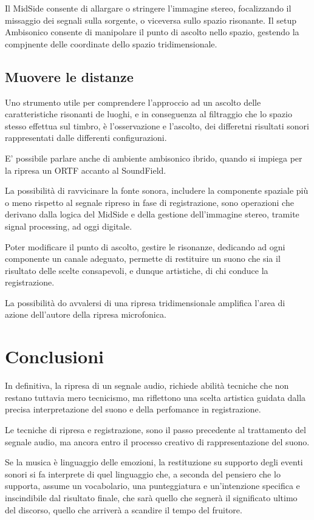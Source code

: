 Il MidSide consente di allargare o stringere l'immagine stereo, focalizzando
il missaggio dei segnali sulla sorgente, o viceversa sullo spazio risonante.
Il setup Ambisonico consente di manipolare il punto di ascolto nello spazio, 
gestendo la compjnente delle coordinate dello spazio tridimensionale.


      
 \subsection*{Muovere le distanze}
 Uno strumento utile per comprendere l'approccio ad un ascolto delle 
 caratteristiche risonanti de luoghi, e in conseguenza al filtraggio che 
 lo spazio stesso effettua sul timbro, è l'osservazione e l'ascolto,
 dei differetni risultati sonori rappresentati dalle differenti configurazioni.
 
 E' possibile parlare anche di ambiente ambisonico ibrido, quando si impiega
 per la ripresa un ORTF accanto al SoundField.
 
 La possibilità di ravvicinare la fonte sonora, includere la componente spaziale
 più o meno rispetto al segnale ripreso in fase di registrazione, sono operazioni
 che derivano dalla logica del MidSide e della gestione dell'immagine stereo,
tramite signal processing, ad oggi digitale.

Poter modificare il punto di ascolto, gestire le risonanze, dedicando ad ogni
componente un canale adeguato, permette di restituire un suono che sia il 
risultato delle scelte consapevoli, e dunque artistiche, di chi conduce la registrazione.

La possibilità do avvalersi di una ripresa tridimensionale amplifica l'area di azione
dell'autore della ripresa microfonica. 



 
\section*{Conclusioni}
  In definitiva, la ripresa di un segnale audio, richiede abilità tecniche che non restano 
  tuttavia mero tecnicismo, ma riflettono una scelta artistica guidata dalla precisa 
  interpretazione del suono e della perfomance in registrazione.
  
  Le tecniche di ripresa e registrazione, sono il passo precedente al trattamento del 
  segnale audio, ma ancora entro il processo creativo di rappresentazione del suono.
  
  Se la musica è linguaggio delle emozioni, la restituzione su supporto degli eventi
  sonori si fa interprete di quel linguaggio che, a seconda del pensiero che lo supporta, 
 assume un vocabolario, una punteggiatura e un'intenzione specifica e inscindibile dal 
 risultato finale, che sarà quello che segnerà il significato ultimo del discorso, quello che 
 arriverà a scandire il tempo del fruitore.
\vfill\null



